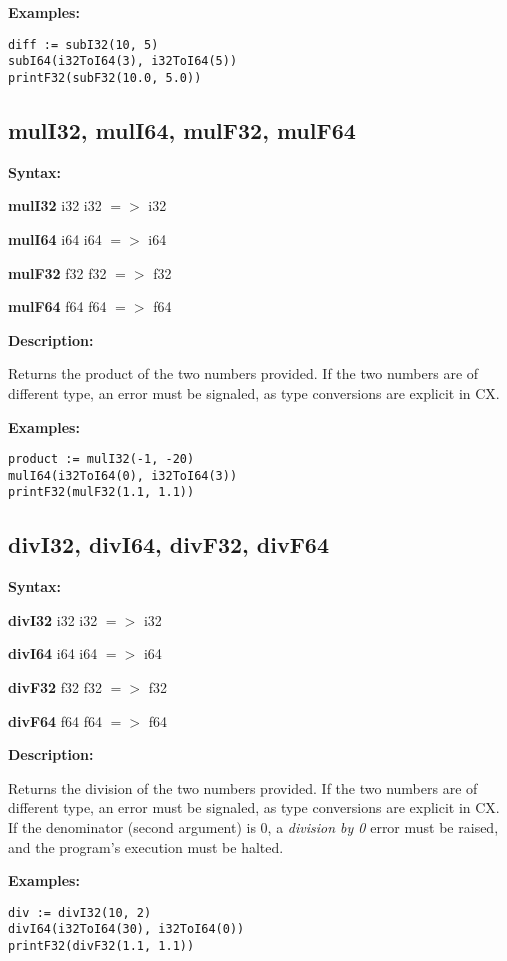 \textbf{Examples:}

\begin{lstlisting}
diff := subI32(10, 5)
subI64(i32ToI64(3), i32ToI64(5))
printF32(subF32(10.0, 5.0))
\end{lstlisting}

\subsection{mulI32, mulI64, mulF32, mulF64}

\textbf{Syntax:}

\textbf{mulI32} i32 i32 $=>$ i32

\textbf{mulI64} i64 i64 $=>$ i64

\textbf{mulF32} f32 f32 $=>$ f32

\textbf{mulF64} f64 f64 $=>$ f64

\textbf{Description:}

Returns the product of the two numbers provided. If the two numbers
are of different type, an error must be signaled, as type conversions
are explicit in CX.

\textbf{Examples:}

\begin{lstlisting}
product := mulI32(-1, -20)
mulI64(i32ToI64(0), i32ToI64(3))
printF32(mulF32(1.1, 1.1))
\end{lstlisting}

\subsection{divI32, divI64, divF32, divF64}

\textbf{Syntax:}

\textbf{divI32} i32 i32 $=>$ i32

\textbf{divI64} i64 i64 $=>$ i64

\textbf{divF32} f32 f32 $=>$ f32

\textbf{divF64} f64 f64 $=>$ f64

\textbf{Description:}

Returns the division of the two numbers provided. If the two numbers
are of different type, an error must be signaled, as type conversions
are explicit in CX. If the denominator (second argument) is 0, a
\textit{division by 0} error must be raised, and the program's
execution must be halted.

\textbf{Examples:}

\begin{lstlisting}
div := divI32(10, 2)
divI64(i32ToI64(30), i32ToI64(0))
printF32(divF32(1.1, 1.1))
\end{lstlisting}

